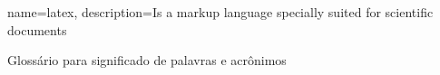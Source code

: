 \makenoidxglossaries
{}
{
    name=latex,
    description={Is a markup language specially suited 
    for scientific documents}
}


{Glossário para significado de palavras e acrônimos}

